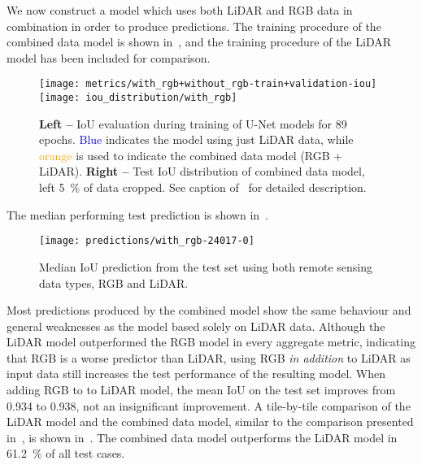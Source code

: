 We now construct a model which uses both LiDAR and RGB data in combination in order to produce predictions.
The training procedure of the combined data model is shown in~, and the training procedure of the LiDAR model has been included for comparison.

\begin{figure}[H]
  \centering
  \texttt{[image: metrics/with\_rgb+without\_rgb-train+validation-iou]}
  \texttt{[image: iou\_distribution/with\_rgb]}
  \caption{%
    \textbf{Left --} IoU evaluation during training of U-Net models for 89 epochs.
    \textcolor{blue}{Blue} indicates the model using just LiDAR data, while \textcolor{orange}{orange} is used to indicate the combined data model (RGB + LiDAR).
    \textbf{Right --} Test IoU distribution of combined data model, left \SI{5}{\percent} of data cropped.
    See caption of~ for detailed description.
  }%
  \label{fig:rgb-lidar-training}
\end{figure}
\vspace{-\baselineskip}
The median performing test prediction is shown in~.
%
\begin{figure}[H]
  \centering
  \texttt{[image: predictions/with\_rgb-24017-0]}  %
  \caption{%
    Median IoU prediction from the test set using both remote sensing data types, RGB and LiDAR.
  }%
  \label{fig:rgb-lidar-median}
\end{figure}

Most predictions produced by the combined model show the same behaviour and general weaknesses as the model based solely on LiDAR data.
Although the LiDAR model outperformed the RGB model in every aggregate metric, indicating that RGB is a worse predictor than LiDAR, using RGB \emph{in addition} to LiDAR as input data still increases the test performance of the resulting model.
When adding RGB to to LiDAR model, the mean IoU on the test set improves from \num{0.934} to \num{0.938}, not an insignificant improvement.
A tile-by-tile comparison of the LiDAR model and the combined data model, similar to the comparison presented in~, is shown in~.
The combined data model outperforms the LiDAR model in \SI{61.2}{\percent} of all test cases.

